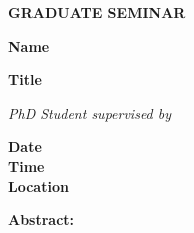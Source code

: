\documentclass[12pt]{article}
\begin{document}
\begin{center}
\sffamily
\Huge\textbf{GRADUATE SEMINAR}

\bigskip
\LARGE\textbf{Name}

\bigskip
\textbf{Title}

\bigskip
\large
\textit{PhD Student supervised by}

\Large
\bigskip
\textbf{Date
\\Time
\\Location
}
\end{center}

\bigskip

\sffamily\large\noindent\textbf{Abstract:} 


 
\end{document}
